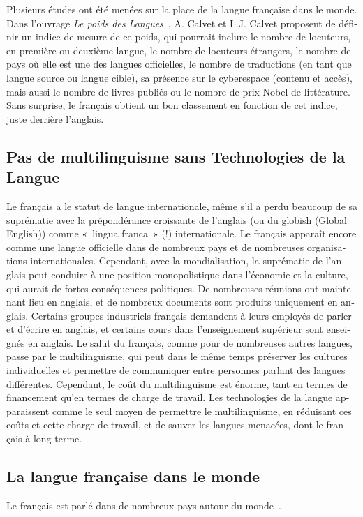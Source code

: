 \begin{french}
\begin{multicols}{2}
Plusieurs études ont été menées sur la place de la langue française
dans le monde. Dans l'ouvrage {\em Le poids des
  Langues}~\cite{calvet09}, A. Calvet et L.J. Calvet proposent de
définir un indice de mesure de ce poids, qui pourrait inclure le
nombre de locuteurs, en première ou deuxième langue, le nombre de
locuteurs étrangers, le nombre de pays où elle est une des langues
officielles, le nombre de traductions (en tant que langue source ou
langue cible), sa présence sur le cyberespace (contenu et accès), mais
aussi le nombre de livres publiés ou le nombre de prix Nobel de
littérature. Sans surprise, le français obtient un bon classement en
fonction de cet indice, juste derrière l'anglais.

\subsection{Pas de multilinguisme sans Technologies de la Langue}

Le français a le statut de langue internationale, même s'il a
perdu beaucoup de sa suprématie avec la prépondérance croissante de
l'anglais (ou du globish (Global English)) comme «~lingua franca~» (!)
internationale. Le français apparaît encore comme une langue
officielle dans de nombreux pays et de nombreuses organisations
internationales. Cependant, avec la mondialisation, la suprématie de
l'anglais peut conduire à une position monopolistique dans
l'économie et la culture, qui aurait de fortes conséquences
politiques. De nombreuses réunions ont maintenant lieu en anglais, et
de nombreux documents sont produits uniquement en anglais. Certains
groupes industriels français demandent à leurs employés de parler 
et d'écrire en anglais, et certains cours dans l'enseignement supérieur sont enseignés en anglais. Le salut du
français, comme pour de nombreuses autres langues, passe par le
multilinguisme, qui peut dans le même temps préserver les cultures
individuelles et permettre de communiquer entre personnes parlant
des langues différentes. Cependant, le coût du multilinguisme est
énorme, tant en termes de financement qu'en termes de charge
de travail. Les technologies de la langue apparaissent comme le seul
moyen de permettre le multilinguisme, en réduisant ces coûts et cette 
charge de travail, et de sauver les langues menacées, dont le français
à long terme.

\subsection{La langue française dans le monde}
\label{frenchInTheWorld}
Le français est parlé dans de nombreux pays autour du
monde~\cite{francais}.


\end{multicols}
\end{french}
